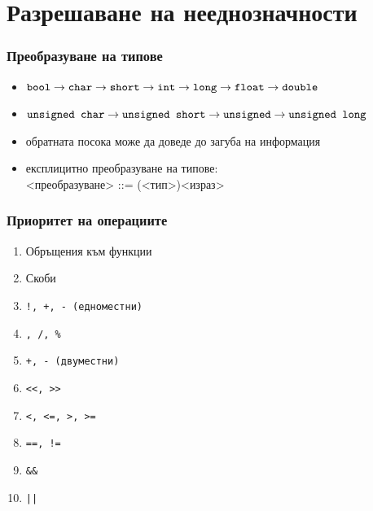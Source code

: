 \documentclass{beamer}
\begin{document}
\section{Разрешаване на нееднозначности}

\begin{frame}
  \frametitle{Преобразуване на типове}
  \begin{itemize}
  \item $\tt{bool}\rightarrow%
    \tt{char}\rightarrow%
    \tt{short}\rightarrow%
    \tt{int}\rightarrow%
    \tt{long}\rightarrow%
    \tt{float}\rightarrow%
    \tt{double}$
  \item $\tt{unsigned char}\rightarrow%
    \tt{unsigned short}\rightarrow%
    \tt{unsigned}\rightarrow%
    \tt{unsigned long}$
  \item обратната посока може да доведе до \alert{загуба на информация}
  \item експлицитно преобразуване на типове:\\
    <преобразуване> ::= \tta(<тип>\tta)<израз>
  \end{itemize}
\end{frame}

\begin{frame}
  \frametitle{Приоритет на операциите}
  \begin{enumerate}
  \item Обръщения към функции
  \item Скоби
  \item \tt!, \tt+, \tt- (едноместни)
  \item \tt*, \tt/, \tt\%
  \item \tt+, \tt- (двуместни)
  \item \tt{<{}<}, \tt{>{}>}
  \item \tt{<}, \tt{<=}, \tt{>}, \tt{>=}
  \item \tt{==}, \tt{!=}
  \item \tt{\&\&}
  \item \tt{||}
  \end{enumerate}
\end{frame}
\end{document}
